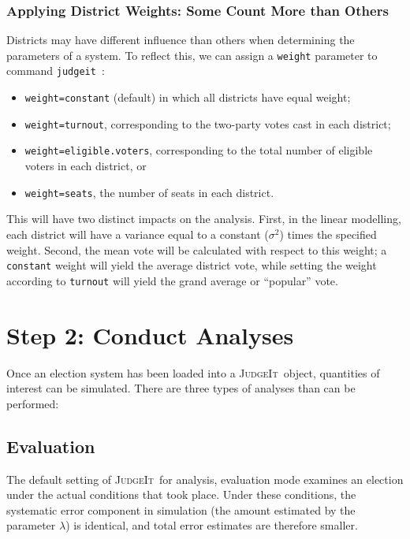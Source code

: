 \documentclass[oneside,letterpaper,titlepage]{article}
\newcommand{\JudgeIt}{\textsc{JudgeIt}\ }
\newcommand{\jud}{\texttt{judgeit}\ }
\begin{document}
\subsubsection*{Applying District Weights: Some Count More than Others}

Districts may have different influence than others when determining the parameters of a system. To reflect this, we can assign a \texttt{weight} parameter to command \jud:

\begin{itemize}
\item \texttt{weight=constant} (default) in which all districts have equal weight;

\item \texttt{weight=turnout}, corresponding to the two-party votes cast in each district;

\item \texttt{weight=eligible.voters}, corresponding to the total number of eligible voters in each district, or

\item \texttt{weight=seats}, the number of seats in each district.
\end{itemize}

This will have two distinct impacts on the analysis. First, in the linear modelling, each district will have a variance equal to a constant ($\sigma^2$) times the specified weight. Second, the mean vote will be calculated with respect to this weight; a \texttt{constant} weight will yield the average district vote, while setting the weight according to \texttt{turnout} will yield the grand average or ``popular'' vote.

\section{Step 2: Conduct Analyses}

Once an election system has been loaded into a \JudgeIt object, quantities of interest can be simulated. There are three types of analyses than can be performed:

\subsection*{Evaluation}

The default setting of \JudgeIt for analysis, evaluation mode examines an election under the actual conditions that took place. Under these conditions, the systematic error component in simulation (the amount estimated by the parameter $\lambda$) is identical, and total error estimates are therefore smaller.
\end{document}
